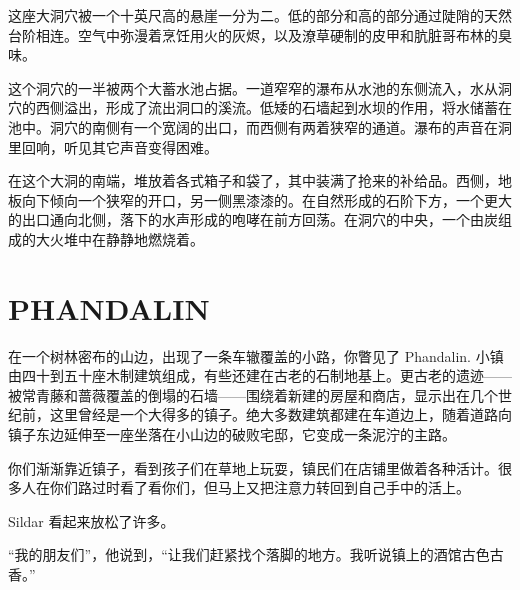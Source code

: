 \documentclass[letterpaper,twocolumn,openany,nodeprecatedcode]{dndbook}
\begin{document}
\begin{DndReadAloud}
  \begin{chinese}
    这座大洞穴被一个十英尺高的悬崖一分为二。低的部分和高的部分通过陡陗的天然台阶相连。空气中弥漫着烹饪用火的灰烬，以及潦草硬制的皮甲和肮脏哥布林的臭味。
  \end{chinese}
\end{DndReadAloud}

\begin{DndReadAloud}
  \begin{chinese}
    这个洞穴的一半被两个大蓄水池占据。一道窄窄的瀑布从水池的东侧流入，水从洞穴的西侧溢出，形成了流出洞口的溪流。低矮的石墙起到水坝的作用，将水储蓄在池中。洞穴的南侧有一个宽阔的出口，而西侧有两着狭窄的通道。瀑布的声音在洞里回响，听见其它声音变得困难。
  \end{chinese}
\end{DndReadAloud}

\begin{DndReadAloud}
  \begin{chinese}
    在这个大洞的南端，堆放着各式箱子和袋了，其中装满了抢来的补给品。西侧，地板向下倾向一个狭窄的开口，另一侧黑漆漆的。在自然形成的石阶下方，一个更大的出口通向北侧，落下的水声形成的咆哮在前方回荡。在洞穴的中央，一个由炭组成的大火堆中在静静地燃烧着。
  \end{chinese}
\end{DndReadAloud}
\ResetDndAreas

\chapter{PHANDALIN}
\begin{DndReadAloud}
  \begin{chinese}
    在一个树林密布的山边，出现了一条车辙覆盖的小路，你瞥见了 Phandalin. 小镇由四十到五十座木制建筑组成，有些还建在古老的石制地基上。更古老的遗迹——被常青藤和蔷薇覆盖的倒塌的石墙——围绕着新建的房屋和商店，显示出在几个世纪前，这里曾经是一个大得多的镇子。绝大多数建筑都建在车道边上，随着道路向镇子东边延伸至一座坐落在小山边的破败宅邸，它变成一条泥泞的主路。

    你们渐渐靠近镇子，看到孩子们在草地上玩耍，镇民们在店铺里做着各种活计。很多人在你们路过时看了看你们，但马上又把注意力转回到自己手中的活上。
  \end{chinese}
\end{DndReadAloud}

\begin{DndReadAloud}
  \begin{chinese}
    Sildar 看起来放松了许多。

    “我的朋友们”，他说到，“让我们赶紧找个落脚的地方。我听说镇上的酒馆古色古香。”
  \end{chinese}
\end{DndReadAloud}
\end{document}
